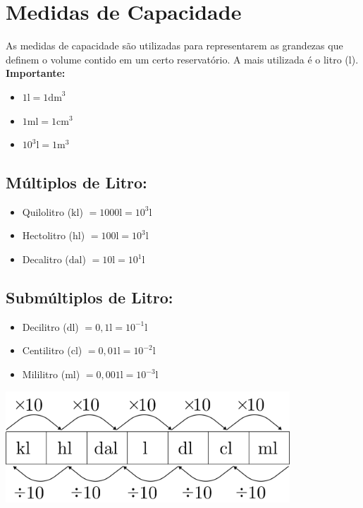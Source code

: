 \section{Medidas de Capacidade}
As medidas de capacidade são utilizadas para representarem
as grandezas que definem o volume contido em um certo
reservatório. A mais utilizada é o litro ($\mathrm{l}$).
	\\\textbf{Importante:}
	\begin{itemize}
	    \item $1\mathrm{l} = 1\mathrm{dm}^3$
	    \item $1 \mathrm{ml} = 1 \mathrm{cm}^3$
	    \item $10^3 \mathrm{l} = 1 \mathrm{m}^3$
	\end{itemize}
	
\begin{multicols}{2}
	\subsection{Múltiplos de Litro:}
		\begin{itemize}
		    \item Quilolitro ($\mathrm{kl}$) $= 1000 \mathrm{l} = 10^3 \mathrm{l}$
		    \item Hectolitro ($\mathrm{hl}$) $= 100 \mathrm{l} = 10^3 \mathrm{l}$
		    \item Decalitro ($\mathrm{dal}$) $= 10 \mathrm{l} = 10^1\mathrm{l}$
		\end{itemize}

	\subsection{Submúltiplos de Litro:}
		\begin{itemize}
		    \item Decilitro ($\mathrm{dl}$) $= 0,1 \mathrm{l} = 10^{-1}\mathrm{l}$
		    \item Centilitro ($\mathrm{cl}$) $= 0,01 \mathrm{l} = 10^{-2}\mathrm{l}$
		    \item Mililitro ($\mathrm{ml}$) $= 0,001 \mathrm{l} = 10^{-3}\mathrm{l}$
		\end{itemize}
\columnbreak    
     \bigskip
     \noindent   
     \begin{minipage}{\linewidth}
    \centering 
    \includegraphics[width=0.8\textwidth]{imagens/matematicaBasica/sistemaDeUnidades/MultiplosDeLitro.pdf}
     \end{minipage}
   \end{multicols}  
